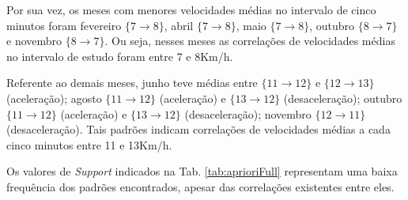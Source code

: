 \documentclass[
	12pt,				%
	oneside,			%
	a4paper,			%
	english,			%
	brazil				%
	]{abntex2ppgsi}
\begin{document}
Por sua vez, os meses com menores velocidades médias no intervalo de cinco minutos foram fevereiro $\lbrace 7 \rightarrow 8\rbrace$, abril $\lbrace 7 \rightarrow 8 \rbrace$, maio $\lbrace7 \rightarrow 8\rbrace$, outubro $\lbrace8 \rightarrow 7\rbrace$ e novembro $\lbrace8 \rightarrow 7\rbrace$. Ou seja, nesses meses as correlações de velocidades médias no intervalo de estudo foram entre 7 e 8Km/h.

Referente ao demais meses, junho teve médias entre $\lbrace11 \rightarrow 12\rbrace$ e $\lbrace12 \rightarrow 13\rbrace$ (aceleração); agosto $\lbrace11 \rightarrow 12\rbrace$ (aceleração) e $\lbrace13 \rightarrow 12\rbrace$  (desaceleração); outubro $\lbrace11 \rightarrow 12\rbrace$ (aceleração) e $\lbrace13 \rightarrow 12\rbrace$ (desaceleração); novembro $\lbrace12 \rightarrow 11\rbrace$ (desaceleração). Tais padrões indicam correlações de velocidades médias a cada cinco minutos entre 11 e 13Km/h.

Os valores de \textit{Support} indicados na Tab. \ref{tab:aprioriFull} representam uma baixa frequência dos padrões encontrados, apesar das correlações existentes entre eles. 
\end{document}
